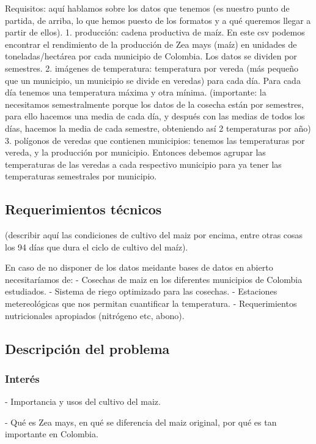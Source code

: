 \documentclass[12pt, spanish]{article}
\begin{document}
Requisitos: aquí hablamos sobre los datos que tenemos (es nuestro punto de partida, de arriba, lo que hemos puesto de los formatos y a qué queremos llegar a partir de ellos).
1. producción: cadena productiva de maíz. En este csv podemos encontrar el rendimiento de la producción de Zea mays (maíz) en unidades de toneladas/hectárea por cada municipio de Colombia. Los datos se dividen por semestres.
2. imágenes de temperatura: temperatura por vereda (más pequeño que un municipio, un municipio se divide en veredas) para cada día. Para cada día tenemos una temperatura máxima y otra mínima. (importante: la necesitamos semestralmente porque los datos de la cosecha están por semestres, para ello hacemos una media de cada día, y después con las medias de todos los días, hacemos la media de cada semestre, obteniendo así 2 temperaturas por año)
3. polígonos de veredas que contienen municipios: tenemos las temperaturas por vereda, y la producción por municipio. Entonces debemos agrupar las temperaturas de las veredas a cada respectivo municipio para ya tener las temperaturas semestrales por municipio.

\subsection{Requerimientos técnicos}

(describir aquí las condiciones de cultivo del maiz por encima, entre otras cosas los 94 días que dura el ciclo de cultivo del maíz).

En caso de no disponer de los datos meidante bases de datos en abierto necesitaríamos de: 
- Cosechas de maiz en los diferentes municipios de Colombia estudiados.
- Sistema de riego optimizado para las cosechas.
- Estaciones metereológicas que nos permitan cuantificar la temperatura.
- Requerimientos nutricionales apropiados (nitrógeno etc, abono).

\subsection{Descripción del problema}

\subsubsection{Interés}

- Importancia y usos del cultivo del maiz.

- Qué es Zea mays, en qué se diferencia del maiz original, por qué es tan importante en Colombia.
\end{document}

